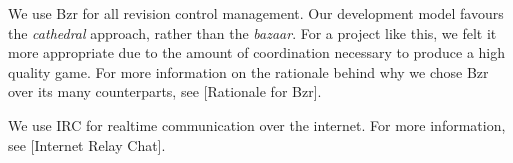 

\startitemize[4]

We use Bzr for all revision control management. Our development model favours the {\it cathedral} approach, rather than the {\it bazaar}. For a project like this, we felt it more appropriate due to the amount of coordination necessary to produce a high quality game. For more information on the rationale behind why we chose Bzr over its many counterparts, see [Rationale for Bzr].


We use IRC for realtime communication over the internet. For more information, see [Internet Relay Chat].
\stopitemize

